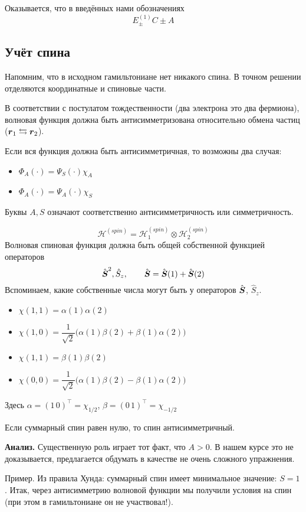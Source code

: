 Оказывается, что в введённых нами обозначениях
$$
\boxed{
    E_{\pm}^{(1)} C \pm A
}
$$
\subsection{Учёт спина}
Напомним, что в исходном гамильтониане нет никакого спина. В точном решении отделяются координатные и спиновые части.

В соответствии с постулатом тождественности (два электрона это два фермиона), волновая функция должна быть антисимметризована относительно обмена частиц ($\bf r_1 \leftrightarrows \bf r_2$). 

Если вся функция должна быть антисимметричная, то возможны два случая:
\begin{itemize}
  \item $\Phi_A(\cdot) = \Psi_S(\cdot) \chi_A$
  \item $\Phi_A(\cdot) = \Psi_A(\cdot) \chi_S$
\end{itemize}
Буквы $A, S$ означают соответственно антисимметричность или симметричность.

\def \H {\mathcal H}
$$
    \H^{(spin)} = \H^{(spin)}_1 \otimes \H^{(spin)}_2
$$
Волновая спиновая функция должна быть общей собственной функцией операторов
$$
    \hat {\bf S}^2, \hat S_z, \qquad \hat{\bf S} = \hat{\bf S} (1) + \hat {\bf S} (2)
$$
Вспоминаем, какие собственные числа могут быть у операторов $\hat{\bf S}$, $\hat S_z$.
\begin{itemize}
  \item $\chi(1,1) = \alpha (1) \alpha (2)$
  \item $\chi(1, 0) = \dfrac{1}{\sqrt 2} \big(
    \alpha(1) \beta(2) + \beta(1) \alpha(2)
\big)$
  \item $\chi(1,1) = \beta(1) \beta(2)$
    \item $\chi(0,0) = \dfrac{1}{\sqrt 2} \big(
    \alpha(1) \beta(2) - \beta(1) \alpha(2)
\big)$
\end{itemize}
Здесь $\alpha = (1 \, 0)^\top = \chi_{1/2}$, $\beta = (0 \, 1)^{\top} = \chi_{-1/2}$

Если суммарный спин равен нулю, то спин антисимметричный.

\textbf{Анализ.} Существенную роль играет тот факт, что $A > 0$.  В нашем курсе это не доказывается, предлагается обдумать в качестве не очень сложного упражнения.

Пример. Из правила Хунда: суммарный спин имеет минимальное значение: $S = 1$. Итак, через антисимметрию волновой функции мы получили условия на спин (при этом в гамильтониане он не участвовал!).

